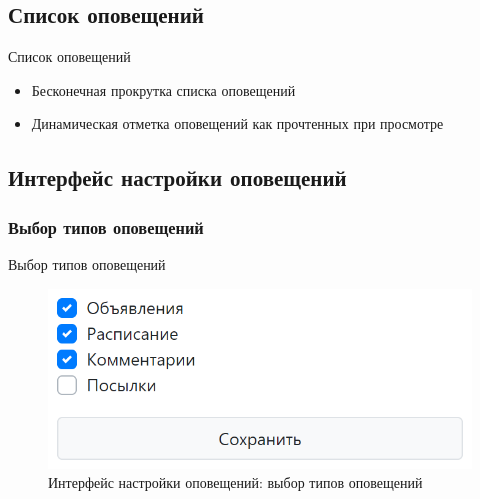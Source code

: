 \documentclass[10pt,pdf,hyperref={unicode}]{beamer}
\begin{document}
\subsection{Список оповещений}
\begin{frame}{Список оповещений}
    \begin{itemize}
        \item Бесконечная прокрутка списка оповещений
        \item Динамическая отметка оповещений как прочтенных при просмотре
    \end{itemize}
\end{frame}
\subsection{Интерфейс настройки оповещений}
\subsubsection{Выбор типов оповещений}
\begin{frame}{Выбор типов оповещений}
    \begin{figure}
        \includegraphics[scale=0.4]{activity-settings}
        \caption{Интерфейс настройки оповещений: выбор типов оповещений}
        \centering
    \end{figure}
\end{frame}
\end{document}
